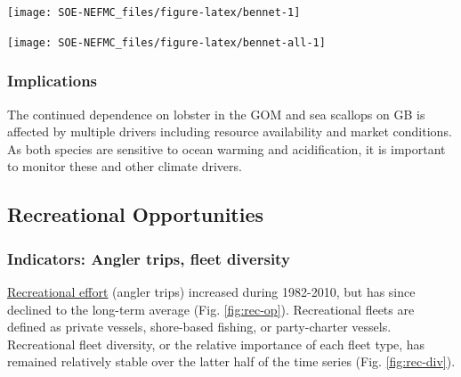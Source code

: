 \documentclass[
  10pt,
]{article}
\let\origfigure\figure
\let\endorigfigure\endfigure
\renewenvironment{figure}[1][2] {
    \expandafter\origfigure\expandafter[H]
} {
    \endorigfigure
}
\begin{document}
\begin{figure}

{\centering \texttt{[image: SOE-NEFMC\_files/figure-latex/bennet-1]} 

}

\caption{Revenue change from the 1982 baseline in 2022 dollars (black), price, and volume for commercial landings from Georges Bank (GB: left) and the Gulf of Maine (GOM: right)}\label{fig:bennet}
\end{figure}
\begin{figure}

{\centering \texttt{[image: SOE-NEFMC\_files/figure-latex/bennet-all-1]} 

}

\caption{Revenue change from the long-term mean in 2022 dollars (black), price, and volume for commercial landings from Georges Bank (GB: top panels) and the Gulf of Maine (GOM: bottom panels)}\label{fig:bennet-all}
\end{figure}

\hypertarget{implications-1}{%
\subsubsection{Implications}\label{implications-1}}

The continued dependence on lobster in the GOM and sea scallops on GB is affected by multiple drivers including resource availability and market conditions. As both species are sensitive to ocean warming and acidification, it is important to monitor these and other climate drivers.

\hypertarget{recreational-opportunities}{%
\subsection{Recreational Opportunities}\label{recreational-opportunities}}

\hypertarget{indicators-angler-trips-fleet-diversity}{%
\subsubsection{Indicators: Angler trips, fleet diversity}\label{indicators-angler-trips-fleet-diversity}}

\href{https://noaa-edab.github.io/catalog/recreational-fishing-indicators.html}{Recreational effort} (angler trips) increased during 1982-2010, but has since declined to the long-term average (Fig. \ref{fig:rec-op}). Recreational fleets are defined as private vessels, shore-based fishing, or party-charter vessels. Recreational fleet diversity, or the relative importance of each fleet type, has remained relatively stable over the latter half of the time series (Fig. \ref{fig:rec-div}).
\end{document}
